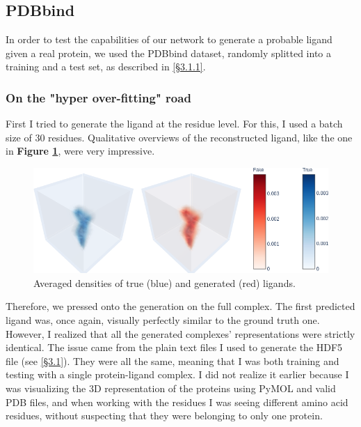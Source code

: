 \documentclass{article}
\begin{document}
\subsection{PDBbind}

In order to test the capabilities of our network to generate a probable ligand given a real protein, we used the PDBbind dataset, randomly splitted into a training and a test set, as described in \hyperref[sec:dataset]{[\S3.1.1]}.

\subsubsection{On the "hyper over-fitting" road}
First I tried to generate the ligand at the residue level. For this, I used a batch size of 30 residues. Qualitative overviews of the reconstructed ligand, like the one in \textbf{Figure \ref{fig:gen_res_wrong}}, were very impressive.
\begin{figure}[H]
    \centering
    \includegraphics[height=4cm,width=\textwidth,keepaspectratio]{gen_res_wrong.png}
    \caption{Averaged densities of true (blue) and generated (red) ligands.}
    \label{fig:gen_res_wrong}
\end{figure}
Therefore, we pressed onto the generation on the full complex. The first predicted ligand was, once again, visually perfectly similar to the ground truth one. However, I realized that all the generated complexes' representations were strictly identical. The issue came from the plain text files I used to generate the HDF5 file (see \hyperref[sec:pdbbind]{[\S3.1]}). They were all the same, meaning that I was both training and testing with a single protein-ligand complex. I did not realize it earlier because I was visualizing the 3D representation of the proteins using PyMOL and valid PDB files, and when working with the residues I was seeing different amino acid residues, without suspecting that they were belonging to only one protein.
\end{document}
